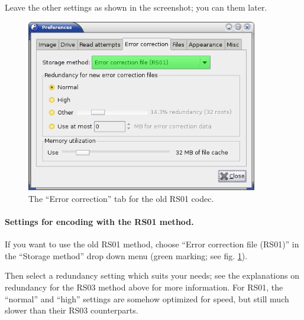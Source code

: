 \smallskip

Leave the other settings as shown in the screenshot; you can
 them later.

\newpage

\begin{figure}[h]
\centerline{\includegraphics[width=0.9\textwidth]{screenshots/eccfile-prefs-ecc-file1.png}}
\caption{The ``Error correction'' tab for the old RS01 codec.}  
\label{howto-eccfile-prefs-ecc-file1}
\end{figure}

\paragraph{Settings for encoding with the RS01 method.} If you want to
use the old RS01 method, choose ``Error correction file (RS01)'' in
the ``Storage method'' drop down menu (green marking; see
fig. \ref{howto-eccfile-prefs-ecc-file1}).

\smallskip

Then select a redundancy setting which suits your needs; see the
explanations on redundancy for the RS03 method above for more information.
For RS01, the ``normal'' and ``high'' settings are somehow optimized for
speed, but still much slower than their RS03 counterparts. 

\newpage

